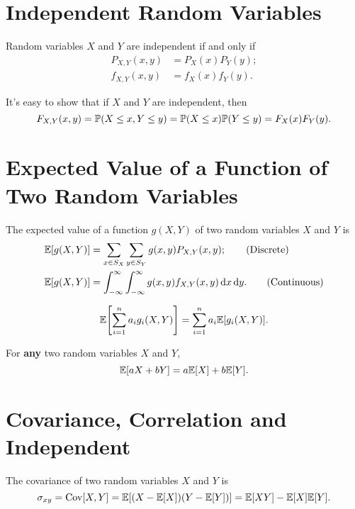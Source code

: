\section{Independent Random Variables}
\begin{definition}
    Random variables $X$ and $Y$ are independent if and only if
    \begin{align}
        P_{X,Y}(x,y) &=P_X(x)P_Y(y); \tag{Discrete}\\
        f_{X,Y}(x,y) &=f_X(x)f_Y(y). \tag{Continuous}
    \end{align}
\end{definition}
It's easy to show that if $X$ and $Y$ are independent, then 
\[F_{X,Y}(x,y)=\P{X\leq x, Y\leq y}=\P{X\leq x}\P{Y\leq y}=F_X(x)F_Y(y).\]

\section{Expected Value of a Function of Two Random Variables}
\begin{theorem}
    The expected value of a function $g(X,Y)$ of two random variables $X$ and $Y$ is
    \begin{align}
        \E{g(X,Y)} &= \sum_{x\in S_X}\sum_{y\in S_Y}g(x,y)P_{X,Y}(x,y); \tag{Discrete}\\
        \E{g(X,Y)} &= \int_{-\infty}^{\infty}\int_{-\infty}^{\infty}g(x,y)f_{X,Y}(x,y)\diff x\diff y. \tag{Continuous}
    \end{align}
\end{theorem} 

\begin{theorem}
    \[\E{\sum_{i=1}^{n}a_ig_i(X,Y)}=\sum_{i=1}^{n}a_i\E{g_i(X,Y)}.\]
\end{theorem}

\begin{theorem}
    For \textbf{any} two random variables $X$ and $Y$,
    \[\E{aX+bY}=a\E{X}+b\E{Y}.\]    
\end{theorem}

\section{Covariance, Correlation and Independent}
\begin{definition}[Covariance]
    The covariance of two random variables $X$ and $Y$ is
    \[\sigma_{xy}=\Cov[X,Y]=\E{(X-\E{X})(Y-\E{Y})}=\E{XY}-\E{X}\E{Y}.\]
\end{definition}


